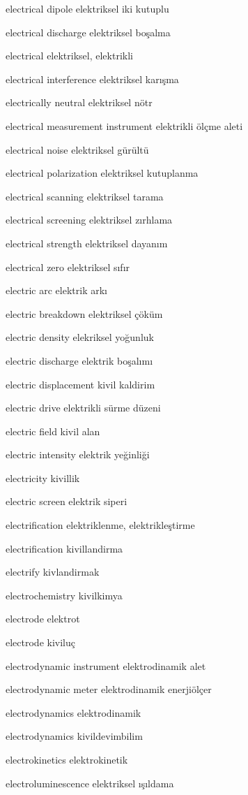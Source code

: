 \documentclass[12pt,fleqn]{article}\usepackage{../../common}
\begin{document}
electrical dipole elektriksel iki kutuplu

electrical discharge elektriksel boşalma

electrical elektriksel, elektrikli

electrical interference elektriksel karışma

electrically neutral elektriksel nötr

electrical measurement instrument elektrikli ölçme aleti

electrical noise elektriksel gürültü

electrical polarization elektriksel kutuplanma

electrical scanning elektriksel tarama

electrical screening elektriksel zırhlama

electrical strength elektriksel dayanım

electrical zero elektriksel sıfır

electric arc elektrik arkı

electric breakdown elektriksel çöküm

electric density elekriksel yoğunluk

electric discharge elektrik boşalımı

electric displacement kivil kaldirim

electric drive elektrikli sürme düzeni

electric field kivil alan

electric intensity elektrik yeğinliği

electricity kivillik

electric screen elektrik siperi

electrification elektriklenme, elektrikleştirme

electrification kivillandirma

electrify kivlandirmak

electrochemistry kivilkimya

electrode elektrot

electrode kiviluç

electrodynamic instrument elektrodinamik alet

electrodynamic meter elektrodinamik enerjiölçer

electrodynamics elektrodinamik

electrodynamics kivildevimbilim

electrokinetics elektrokinetik

electroluminescence elektriksel ışıldama
\end{document}
